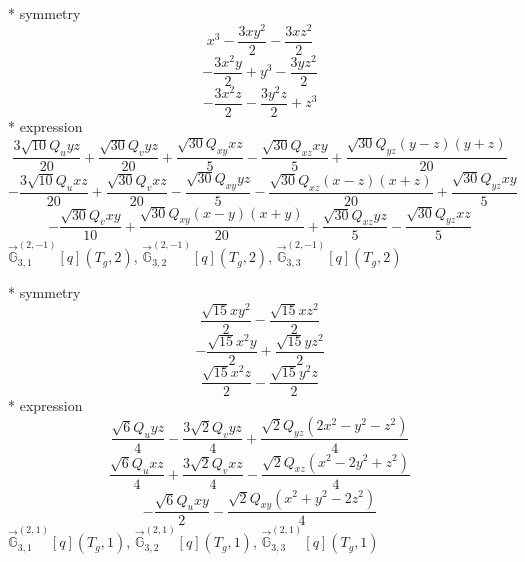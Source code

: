 \documentclass[fleqn,8pt]{jsarticle}
\begin{document}
\noindent\quad ** symmetry
\begin{dmath*}
x^{3} - \frac{3 x y^{2}}{2} - \frac{3 x z^{2}}{2}
\end{dmath*}
\begin{dmath*}
- \frac{3 x^{2} y}{2} + y^{3} - \frac{3 y z^{2}}{2}
\end{dmath*}
\begin{dmath*}
- \frac{3 x^{2} z}{2} - \frac{3 y^{2} z}{2} + z^{3}
\end{dmath*}
\noindent\quad ** expression
\begin{dmath*}
\frac{3 \sqrt{10} Q_{u} y z}{20} + \frac{\sqrt{30} Q_{v} y z}{20} + \frac{\sqrt{30} Q_{xy} x z}{5} - \frac{\sqrt{30} Q_{xz} x y}{5} + \frac{\sqrt{30} Q_{yz} \left(y - z\right) \left(y + z\right)}{20}
\end{dmath*}
\begin{dmath*}
- \frac{3 \sqrt{10} Q_{u} x z}{20} + \frac{\sqrt{30} Q_{v} x z}{20} - \frac{\sqrt{30} Q_{xy} y z}{5} - \frac{\sqrt{30} Q_{xz} \left(x - z\right) \left(x + z\right)}{20} + \frac{\sqrt{30} Q_{yz} x y}{5}
\end{dmath*}
\begin{dmath*}
- \frac{\sqrt{30} Q_{v} x y}{10} + \frac{\sqrt{30} Q_{xy} \left(x - y\right) \left(x + y\right)}{20} + \frac{\sqrt{30} Q_{xz} y z}{5} - \frac{\sqrt{30} Q_{yz} x z}{5}
\end{dmath*}
\noindent\quad $\vec{\mathbb{G}}_{3,1}^{(2,-1)}[q](T_{g},2)$, $\vec{\mathbb{G}}_{3,2}^{(2,-1)}[q](T_{g},2)$, $\vec{\mathbb{G}}_{3,3}^{(2,-1)}[q](T_{g},2)$

\noindent\quad ** symmetry
\begin{dmath*}
\frac{\sqrt{15} x y^{2}}{2} - \frac{\sqrt{15} x z^{2}}{2}
\end{dmath*}
\begin{dmath*}
- \frac{\sqrt{15} x^{2} y}{2} + \frac{\sqrt{15} y z^{2}}{2}
\end{dmath*}
\begin{dmath*}
\frac{\sqrt{15} x^{2} z}{2} - \frac{\sqrt{15} y^{2} z}{2}
\end{dmath*}
\noindent\quad ** expression
\begin{dmath*}
\frac{\sqrt{6} Q_{u} y z}{4} - \frac{3 \sqrt{2} Q_{v} y z}{4} + \frac{\sqrt{2} Q_{yz} \left(2 x^{2} - y^{2} - z^{2}\right)}{4}
\end{dmath*}
\begin{dmath*}
\frac{\sqrt{6} Q_{u} x z}{4} + \frac{3 \sqrt{2} Q_{v} x z}{4} - \frac{\sqrt{2} Q_{xz} \left(x^{2} - 2 y^{2} + z^{2}\right)}{4}
\end{dmath*}
\begin{dmath*}
- \frac{\sqrt{6} Q_{u} x y}{2} - \frac{\sqrt{2} Q_{xy} \left(x^{2} + y^{2} - 2 z^{2}\right)}{4}
\end{dmath*}
\noindent\quad $\vec{\mathbb{G}}_{3,1}^{(2,1)}[q](T_{g},1)$, $\vec{\mathbb{G}}_{3,2}^{(2,1)}[q](T_{g},1)$, $\vec{\mathbb{G}}_{3,3}^{(2,1)}[q](T_{g},1)$
\end{document}

